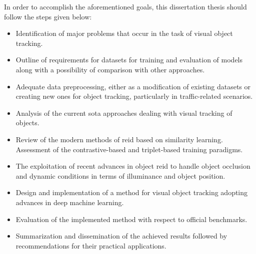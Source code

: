 In order to accomplish the aforementioned goals, this dissertation thesis should follow the steps given below:
\begin{itemize}
    \item Identification of major problems that occur in the task of visual object tracking.
    \item Outline of requirements for datasets for training and evaluation of models along with a possibility of comparison with other approaches.
    \item Adequate data preprocessing, either as a modification of existing datasets or creating new ones for object tracking, particularly in traffic-related scenarios.
    \item Analysis of the current \gls{sota} approaches dealing with visual tracking of objects.
    \item Review of the modern methods of \gls{reid} based on similarity learning. Assessment of the contrastive-based and triplet-based training paradigms.
    \item The exploitation of recent advances in object \gls{reid} to handle object occlusion and dynamic conditions in terms of illuminance and object position. 
    \item Design and implementation of a method for visual object tracking adopting advances in deep machine learning.
    \item Evaluation of the implemented method with respect to official benchmarks.
    \item Summarization and dissemination of the achieved results followed by recommendations for their practical applications.
\end{itemize}
